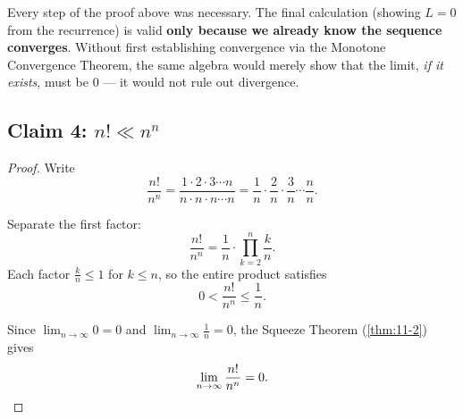 \begin{remark}[Warning]
Every step of the proof above was necessary.  The final calculation (showing $L=0$ from the recurrence) is valid \textbf{only because we already know the sequence converges}.  Without first establishing convergence via the Monotone Convergence Theorem, the same algebra would merely show that the limit, \textit{if it exists}, must be $0$ --- it would not rule out divergence.
\end{remark}

\subsection*{Claim 4: $n!\ll n^{n}$}

\begin{proof}
Write
\[
  \frac{n!}{n^{n}}=\frac{1\cdot 2\cdot 3\cdots n}{n\cdot n\cdot n\cdots n}
  =\frac{1}{n}\cdot\frac{2}{n}\cdot\frac{3}{n}\cdots\frac{n}{n}.
\]


Separate the first factor:
\[
  \frac{n!}{n^{n}}=\frac{1}{n}\cdot\prod_{k=2}^{n}\frac{k}{n}.
\]
Each factor $\frac{k}{n}\le 1$ for $k\le n$, so the entire product satisfies
\[
  0<\frac{n!}{n^{n}}\le\frac{1}{n}.
\]


Since $\lim_{n\to\infty}0=0$ and $\lim_{n\to\infty}\frac{1}{n}=0$, the Squeeze Theorem (\cref{thm:11-2}) gives
\[
  \lim_{n\to\infty}\frac{n!}{n^{n}}=0. \qedhere
\]
\end{proof}
